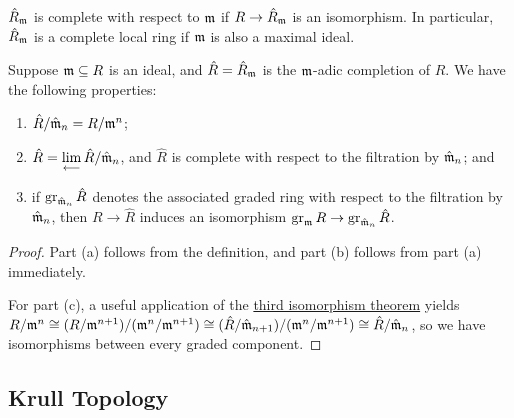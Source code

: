 \begin{definition}
    \(\hat{R}_{\mathfrak{m}}\) is complete with respect to \(\mathfrak{m}\) if \(R \to \hat{R}_{\mathfrak{m}}\) is an isomorphism.
    In particular, \(\hat{R}_{\mathfrak{m}}\) is a complete local ring if \(\mathfrak{m}\) is also a maximal ideal.
\end{definition}

\begin{lemma}\label{lem:completion-properties}
    Suppose \(\mathfrak{m} \subseteq R\) is an ideal,
    and \(\hat{R} = \hat{R}_{\mathfrak{m}}\) is the \(\mathfrak{m}\)-adic completion of \(R\).
    We have the following properties:
    \begin{enumerate}[label={(\alph*)}, itemsep=0mm]
        \item \(\hat{R}/\hat{\mathfrak{m}}_n = R/\mathfrak{m}^n\);
        \item \(\hat{R} = \operatorname{\displaystyle\lim_{\longleftarrow}} \hat{R}/\hat{\mathfrak{m}}_n\),
            and \(\hat{R}\) is complete with respect to the filtration by \(\hat{\mathfrak{m}}_n\); and
        \item if \(\operatorname{gr}_{\hat{\mathfrak{m}}_n} \hat{R}\) denotes the associated graded ring with respect to the filtration by \(\hat{\mathfrak{m}}_n\),
            then \(R \to \hat{R}\) induces an isomorphism \(\operatorname{gr}_{\mathfrak{m}} R \to \operatorname{gr}_{\hat{\mathfrak{m}}_n} \hat{R}\).
    \end{enumerate}
\end{lemma}
\begin{proof}
    Part (a) follows from the definition,
    and part (b) follows from part (a) immediately.

    For part (c), a useful application of the \hyperref[thm:iso-3-ring]{third isomorphism theorem}
    yields \(R/\mathfrak{m}^n \cong (R/\mathfrak{m}^{n+1})/(\mathfrak{m}^n/\mathfrak{m}^{n+1}) \cong (\hat{R}/\hat{\mathfrak{m}}_{n+1})/(\mathfrak{m}^n/\mathfrak{m}^{n+1}) \cong \hat{R}/\hat{\mathfrak{m}}_n\),
    so we have isomorphisms between every graded component.
\end{proof}

\subsection*{Krull Topology}

